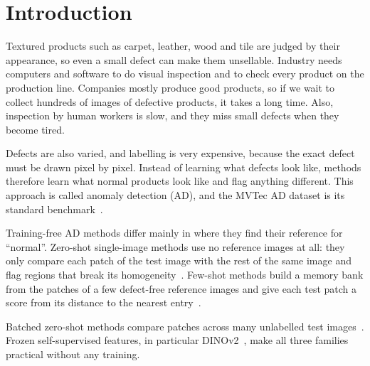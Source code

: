 \section{Introduction}
\label{sec:intro}

Textured products such as carpet, leather, wood and tile are judged by their
appearance, so even a small defect can make them unsellable. Industry needs
computers and software to do visual inspection and to check every product on
the production line. Companies mostly produce good products, so if we wait to
collect hundreds of images of defective products, it takes a long time. Also,
inspection by human workers is slow, and they miss small defects when they
become tired.

Defects are also varied, and labelling is very expensive, because the exact
defect must be drawn pixel by pixel. Instead of learning what defects look
like, methods therefore learn what normal products look like and flag anything
different. This approach is called anomaly detection (AD), and the MVTec AD
dataset is its standard benchmark~\cite{bergmann2021mvtec}.

Training-free AD methods differ mainly in where they find their reference for
``normal''. Zero-shot single-image methods use no reference images at all: they
only compare each patch of the test image with the rest of the same image and
flag regions that break its homogeneity~\cite{aota2023zeroshot,ardelean2024highfidelity,yao2025grnr,zhang2025nlpa}.
Few-shot methods build a memory bank from the patches of a few defect-free
reference images and give each test patch a score from its distance to the
nearest entry~\cite{roth2022patchcore,damm2025anomalydino,lendering2026subspacead}.

Batched zero-shot methods compare patches across many unlabelled test
images~\cite{li2024musc,legia2025consistent}. Frozen self-supervised features,
in particular DINOv2~\cite{oquab2024dinov2}, make all three families practical
without any training.


